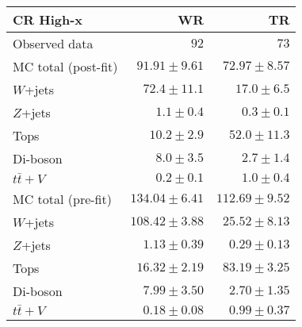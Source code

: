 \begin{table}
  \begin{center}
    \caption{ \label{tab::BGestimation::VRyields_Highx}   }


    \begin{tabular*}{\textwidth}{@{\extracolsep{\fill}}lrr}
      \toprule
      \textbf{CR High-x} & WR & TR \\
      \midrule
      

Observed data & $92$ & $73$ \\
\midrule
\midrule
MC total (post-fit) & $91.91 \pm 9.61$ & $72.97 \pm 8.57$ \\
\midrule
$W$+jets & $72.4 \pm 11.1$ & $17.0 \pm 6.5$ \\
$Z$+jets & $1.1 \pm 0.4$ & $0.3 \pm 0.1$ \\
Tops & $10.2 \pm 2.9$ & $52.0 \pm 11.3$ \\
Di-boson & $8.0 \pm 3.5$ & $2.7 \pm 1.4$ \\
$t\bar{t}+V$ & $0.2 \pm 0.1$ & $1.0 \pm 0.4$ \\
\midrule
\midrule
MC total (pre-fit) & $134.04 \pm 6.41$ & $112.69 \pm 9.52$ \\
\midrule
$W$+jets & $108.42 \pm 3.88$ & $25.52 \pm 8.13$ \\
$Z$+jets & $1.13 \pm 0.39$ & $0.29 \pm 0.13$ \\
Tops & $16.32 \pm 2.19$ & $83.19 \pm 3.25$ \\
Di-boson & $7.99 \pm 3.50$ & $2.70 \pm 1.35$ \\
$t\bar{t}+V$ & $0.18 \pm 0.08$ & $0.99 \pm 0.37$ \\
    \bottomrule
    \end{tabular*}
    
  \end{center}
\end{table}


